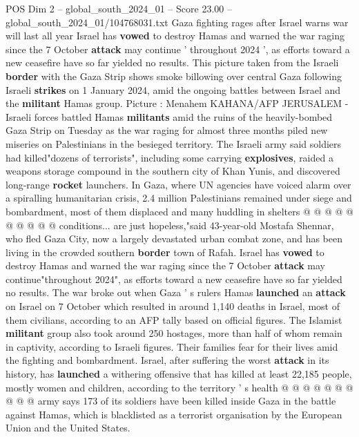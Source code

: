 \begin{textsample}{POS Dim 2 – global\_south\_2024\_01 – Score 23.00 – global\_south\_2024\_01/104768031.txt}  \label{ex:f2_pos_100}
Gaza fighting rages after Israel warns war will last all year Israel has \textbf{vowed} to destroy Hamas and warned the war raging since the 7 October \textbf{attack} may continue ' throughout 2024 ', as efforts toward a new ceasefire have so far yielded no results.
This picture taken from the Israeli \textbf{border} with the Gaza Strip shows smoke billowing over central Gaza following Israeli \textbf{strikes} on 1 January 2024, amid the ongoing battles between Israel and the \textbf{militant} Hamas group.
Picture : Menahem KAHANA/AFP JERUSALEM - Israeli forces battled Hamas \textbf{militants} amid the ruins of the heavily-bombed Gaza Strip on Tuesday as the war raging for almost three months piled new miseries on Palestinians in the besieged territory.
The Israeli army said soldiers had killed"dozens of terrorists", including some carrying \textbf{explosives}, raided a weapons storage compound in the southern city of Khan Yunis, and discovered long-range \textbf{rocket} launchers.
In Gaza, where UN agencies have voiced alarm over a spiralling humanitarian crisis, 2.4 million Palestinians remained under siege and bombardment, most of them displaced and many huddling in shelters @ @ @ @ @ @ @ @ @ @ conditions... are just hopeless,"said 43-year-old Mostafa Shennar, who fled Gaza City, now a largely devastated urban combat zone, and has been living in the crowded southern \textbf{border} town of Rafah.
Israel has \textbf{vowed} to destroy Hamas and warned the war raging since the 7 October \textbf{attack} may continue"throughout 2024", as efforts toward a new ceasefire have so far yielded no results.
The war broke out when Gaza ' s rulers Hamas \textbf{launched} an \textbf{attack} on Israel on 7 October which resulted in around 1,140 deaths in Israel, most of them civilians, according to an AFP tally based on official figures.
The Islamist \textbf{militant} group also took around 250 hostages, more than half of whom remain in captivity, according to Israeli figures.
Their families fear for their lives amid the fighting and bombardment.
Israel, after suffering the worst \textbf{attack} in its history, has \textbf{launched} a withering offensive that has killed at least 22,185 people, mostly women and children, according to the territory ' s health @ @ @ @ @ @ @ @ @ @ army says 173 of its soldiers have been killed inside Gaza in the battle against Hamas, which is blacklisted as a terrorist organisation by the European Union and the United States.

\end{textsample}

